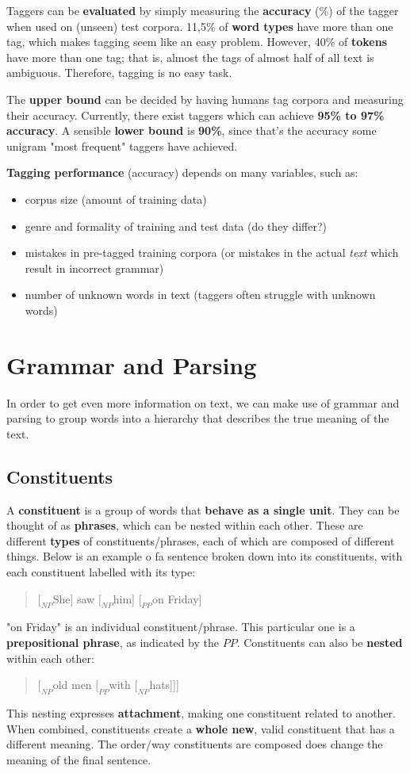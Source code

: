 \documentclass{article}
\begin{document}
Taggers can be \textbf{evaluated} by simply measuring the \textbf{accuracy} (\%) of the tagger when used on (unseen) test corpora. 11,5\% of \textbf{word types} have more than one tag, which makes tagging seem like an easy problem. However, 40\% of \textbf{tokens} have more than one tag; that is, almost the tags of almost half of all text is ambiguous. Therefore, tagging is no easy task.

The \textbf{upper bound} can be decided by having humans tag corpora and measuring their accuracy. Currently, there exist taggers which can achieve \textbf{95\% to 97\% accuracy}. A sensible \textbf{lower bound} is \textbf{90\%}, since that's the accuracy some unigram "most frequent" taggers have achieved.

\textbf{Tagging performance} (accuracy) depends on many variables, such as:
\begin{itemize}
	\item corpus size (amount of training data)
	\item genre and formality of training and test data (do they differ?)
	\item mistakes in pre-tagged training corpora (or mistakes in the actual \textit{text} which result in incorrect grammar)
	\item number of unknown words in text (taggers often struggle with unknown words)
\end{itemize}

\section{Grammar and Parsing}

In order to get even more information on text, we can make use of grammar and parsing to group words into a hierarchy that describes the true meaning of the text. 

\subsection{Constituents}

A \textbf{constituent} is a group of words that \textbf{behave as a single unit}. They can be thought of as \textbf{phrases}, which can be nested within each other. These are different \textbf{types} of constituents/phrases, each of which are composed of different things. Below is an example o fa sentence broken down into its constituents, with each constituent labelled with its type:
\begin{quote}
	$[_{NP}$She] saw $[_{NP}$him] $[_{PP}$on Friday]
\end{quote}
"on Friday" is an individual constituent/phrase. This particular one is a \textbf{prepositional phrase}, as indicated by the $PP$. Constituents can also be \textbf{nested} within each other:
\begin{quote}
	$[_{NP}$old men $[_{PP}$with $[_{NP}$hats]]]
\end{quote}
This nesting expresses \textbf{attachment}, making one constituent related to another. When combined, constituents create a \textbf{whole new}, valid constituent that has a different meaning. The order/way constituents are composed does change the meaning of the final sentence.
\end{document}

